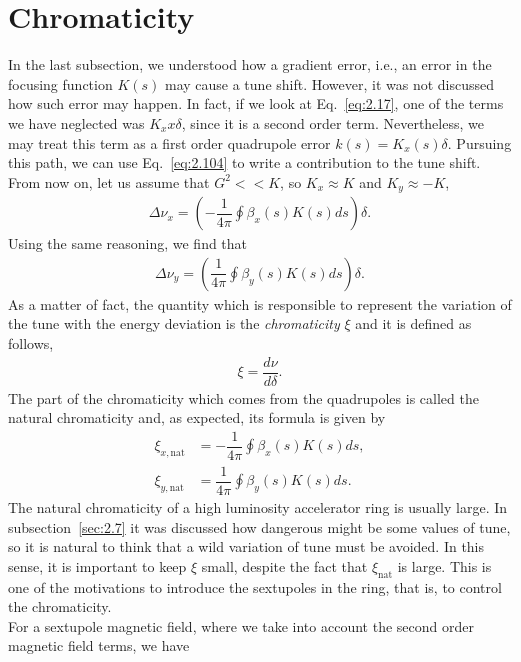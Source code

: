 \section{Chromaticity}

In the last subsection, we understood how a gradient error, i.e., an error in the focusing function $K(s)$ may cause a tune shift. However, it was not discussed how such error may happen. In fact, if we look at Eq.~\eqref{eq:2.17}, one of the terms we have neglected was $K_x x \delta$, since it is a second order term. Nevertheless, we may treat this term as a first order quadrupole error $k(s) = K_x(s) \delta$. Pursuing this path, we can use Eq.~\eqref{eq:2.104} to write a contribution to the tune shift. From now on, let us assume that ${G^2 << K}$, so $K_x \approx K$ and $K_y \approx -K$,
\begin{align}\label{eq:Dnux_delta}
	\Delta\nu_x = \left( -\dfrac{1}{4\pi}\oint\beta_x(s) K(s)ds \right) \delta.
\end{align}
Using the same reasoning, we find that
\begin{align}\label{eq:Dnuy_delta}
	\Delta\nu_y = \left( \dfrac{1}{4\pi}\oint\beta_y(s) K(s)ds \right) \delta.
\end{align}
As a matter of fact, the quantity which is responsible to represent the variation of the tune with the energy deviation is the \emph{chromaticity} $\xi$ and it is defined as follows,
\begin{align}
	\xi = \dfrac{d\nu}{d\delta}.	
\end{align}
The part of the chromaticity which comes from the quadrupoles is called the natural chromaticity and, as expected, its formula is given by
\begin{align}
	\xi_{x,\text{nat}} &= -\dfrac{1}{4\pi}\oint\beta_x(s) K(s)ds,\\
   	\xi_{y,\text{nat}} &= \dfrac{1}{4\pi}\oint\beta_y(s) K(s)ds.
\end{align}
The natural chromaticity of a high luminosity accelerator ring is usually large. In subsection~\ref{sec:2.7} it was discussed how dangerous might be some values of tune, so it is natural to think that a wild variation of tune must be avoided. In this sense, it is important to keep $\xi$ small, despite the fact that $\xi_\text{nat}$ is large. This is one of the motivations to introduce the sextupoles in the ring, that is, to control the chromaticity.\\
For a sextupole magnetic field, where we take into account the second order magnetic field terms, we have
